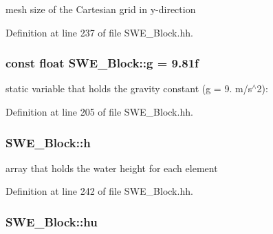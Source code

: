 mesh size of the Cartesian grid in y-\/direction 



Definition at line 237 of file S\+W\+E\+\_\+\+Block.\+hh.

\subsubsection[{\texorpdfstring{g}{g}}]{\setlength{\rightskip}{0pt plus 5cm}const float S\+W\+E\+\_\+\+Block\+::g = 9.\+81f\hspace{0.3cm}{\ttfamily [static]}}\hypertarget{classSWE__Block_a073ca743ff4077a7e456906be704958f}{}\label{classSWE__Block_a073ca743ff4077a7e456906be704958f}


static variable that holds the gravity constant (g = 9. m/s$^\wedge$2)\+: 



Definition at line 205 of file S\+W\+E\+\_\+\+Block.\+hh.

\subsubsection[{\texorpdfstring{h}{h}}]{ S\+W\+E\+\_\+\+Block\+::h\hspace{0.3cm}{\ttfamily [protected]}}\hypertarget{classSWE__Block_a64a0f8f437f38b5f3b8ec5b4abdb864e}{}\label{classSWE__Block_a64a0f8f437f38b5f3b8ec5b4abdb864e}


array that holds the water height for each element 



Definition at line 242 of file S\+W\+E\+\_\+\+Block.\+hh.

\subsubsection[{\texorpdfstring{hu}{hu}}]{ S\+W\+E\+\_\+\+Block\+::hu\hspace{0.3cm}{\ttfamily [protected]}}\hypertarget{classSWE__Block_aec2c1278fdb23f083216d8d397f26060}{}\label{classSWE__Block_aec2c1278fdb23f083216d8d397f26060}


